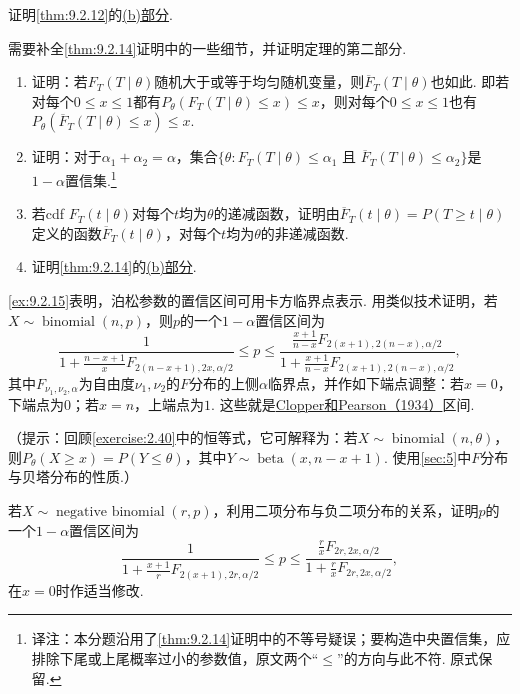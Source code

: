 \begin{exercise}\label{exercise:9.19}
证明\autoref{thm:9.2.12}的\hyperref[item:9.2.12.ii]{(b)部分}.
\end{exercise}
\begin{exercise}\label{exercise:9.20}
需要补全\autoref{thm:9.2.14}证明中的一些细节，并证明定理的第二部分.
\begin{enumerate}
\item 证明：若$F_T(T\mid\theta)$随机大于或等于均匀随机变量，则$\overline F_T(T\mid\theta)$也如此. 即若对每个$0\le x\le1$都有$P_\theta(F_T(T\mid\theta)\le x)\le x$，则对每个$0\le x\le1$也有$P_\theta(\overline F_T(T\mid\theta)\le x)\le x$.
\item 证明：对于$\alpha_1+\alpha_2=\alpha$，集合$\{\theta:F_T(T\mid\theta)\le\alpha_1\text{ 且 }\overline F_T(T\mid\theta)\le\alpha_2\}$是$1-\alpha$置信集.\footnote{译注：本分题沿用了\autoref{thm:9.2.14}证明中的不等号疑误；要构造中央置信集，应排除下尾或上尾概率过小的参数值，原文两个“$\le$”的方向与此不符. 原式保留.}
\item 若cdf $F_T(t\mid\theta)$对每个$t$均为$\theta$的递减函数，证明由$\overline F_T(t\mid\theta)=P(T\ge t\mid\theta)$定义的函数$\overline F_T(t\mid\theta)$，对每个$t$均为$\theta$的非递减函数.
\item 证明\autoref{thm:9.2.14}的\hyperref[item:9.2.14.ii]{(b)部分}.
\end{enumerate}
\end{exercise}
\begin{exercise}\label{exercise:9.21}
\autoref{ex:9.2.15}表明，泊松参数的置信区间可用卡方临界点表示. 用类似技术证明，若$X\sim\operatorname{binomial}(n,p)$，则$p$的一个$1-\alpha$置信区间为
$$\frac1{1+\frac{n-x+1}xF_{2(n-x+1),2x,\alpha/2}}\le p\le\frac{\frac{x+1}{n-x}F_{2(x+1),2(n-x),\alpha/2}}{1+\frac{x+1}{n-x}F_{2(x+1),2(n-x),\alpha/2}},$$
其中$F_{\nu_1,\nu_2,\alpha}$为自由度$\nu_1,\nu_2$的$F$分布的上侧$\alpha$临界点，并作如下端点调整：若$x=0$，下端点为$0$；若$x=n$，上端点为$1$. 这些就是\hyperref[bib:source79]{Clopper和Pearson（1934）}区间.

（提示：回顾\autoref{exercise:2.40}中的恒等式，它可解释为：若$X\sim\operatorname{binomial}(n,\theta)$，则$P_\theta(X\ge x)=P(Y\le\theta)$，其中$Y\sim\operatorname{beta}(x,n-x+1)$. 使用\autoref{sec:5}中$F$分布与贝塔分布的性质.）
\end{exercise}
\begin{exercise}\label{exercise:9.22}
若$X\sim\operatorname{negative\ binomial}(r,p)$，利用二项分布与负二项分布的关系，证明$p$的一个$1-\alpha$置信区间为
$$\frac1{1+\frac{x+1}rF_{2(x+1),2r,\alpha/2}}\le p\le\frac{\frac rxF_{2r,2x,\alpha/2}}{1+\frac rxF_{2r,2x,\alpha/2}},$$
在$x=0$时作适当修改.
\end{exercise}
